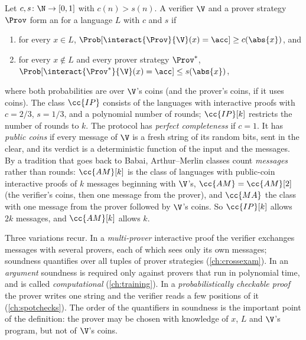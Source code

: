 \begin{refsection}
\begin{definition}\label{def:toolkit:ip}
Let $c,s\colon\N\to[0,1]$ with $c(n)>s(n)$. A verifier $\V$ and a prover strategy $\Prov$ form an  for a language $L$ with  $c$ and  $s$ if
\begin{enumerate}
\item for every $x\in L$, $\Prob[\interact{\Prov}{\V}(x)=\acc]\ge c(\abs{x})$, and
\item for every $x\notin L$ and every prover strategy $\Prov^*$, $\Prob[\interact{\Prov^*}{\V}(x)=\acc]\le s(\abs{x})$,
\end{enumerate}
where both probabilities are over $\V$'s coins (and the prover's coins, if it uses coins). The class $\cc{IP}$ consists of the languages with interactive proofs with $c=2/3$, $s=1/3$, and a polynomial number of rounds; $\cc{IP}[k]$ restricts the number of rounds to $k$. The protocol has \emph{perfect completeness} if $c=1$. It has \emph{public coins} if every message of $\V$ is a fresh string of its random bits, sent in the clear, and its verdict is a deterministic function of the input and the messages. By a tradition that goes back to Babai, Arthur--Merlin classes count \emph{messages} rather than rounds: $\cc{AM}[k]$ is the class of languages with public-coin interactive proofs of $k$ messages beginning with $\V$'s, $\cc{AM}=\cc{AM}[2]$ (the verifier's coins, then one message from the prover), and $\cc{MA}$ the class with one message from the prover followed by $\V$'s coins. So $\cc{IP}[k]$ allows $2k$ messages, and $\cc{AM}[k]$ allows $k$.
\end{definition}

Three variations recur. In a \emph{multi-prover} interactive proof the verifier exchanges messages with several provers, each of which sees only its own messages; soundness quantifies over all tuples of prover strategies (\cref{ch:crossexam}). In an \emph{argument} soundness is required only against provers that run in polynomial time, and is called \emph{computational} (\cref{ch:training}). In a \emph{probabilistically checkable proof} the prover writes one string and the verifier reads a few positions of it (\cref{ch:spotchecks}). The order of the quantifiers in soundness is the important point of the definition: the prover may be chosen with knowledge of $x$, $L$ and $\V$'s program, but not of $\V$'s coins.


\end{refsection}

